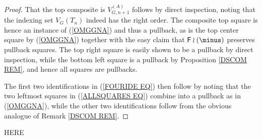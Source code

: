 \documentclass[a4paper,10pt]{article}%
\begin{document}
\begin{proof}
	That the top composite is $V_{G,n+1}^{(A)}$ follows by direct inspection, noting that the indexing set $V_G(T_n)$ indeed has the right order. The composite top square is hence an instance of (\ref{OMGGNA}) and thus a pullback, as is the top center square by (\ref{OMGGNA}) together with 
	the easy claim that $\Fin \wr (\minus)$ preserves pullback squares. The top right square is easily shown to be a pullback by direct inspection, while the bottom left square is a pullback by Proposition \ref{DSCOM REM}, and hence all squares are pullbacks.
	
	The first two identifications in (\ref{FOURIDE EQ})
	then follow by noting that the two leftmost squares
	in (\ref{ALLSQUARES EQ}) combine into a pullback as in (\ref{OMGGNA}), while the other two identifications follow from the obvious analogue of Remark \ref{DSCOM REM}.
\end{proof}

{\color{red} HERE}
\end{document}
